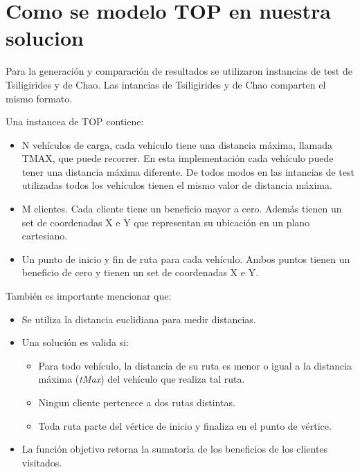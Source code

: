 \section{Como se modelo TOP en nuestra solucion}

Para la generación y comparación de resultados se utilizaron instancias de test de Tsiligirides y de Chao. Las intancias de Tsiligirides y de Chao comparten el mismo formato. 

\bigskip

\begin{minipage}{\textwidth}
Una instancea de TOP contiene:

\begin{itemize}
  \item N vehículos de carga, cada vehículo tiene una distancia máxima, llamada TMAX, que puede recorrer. En esta implementación cada vehículo puede tener una distancia máxima diferente. De todos modos en las intancias de test utilizadas todos los vehículos tienen el mismo valor de distancia máxima.
  \item M clientes. Cada cliente tiene un beneficio mayor a cero. Además tienen un set de coordenadas X e Y que representan su ubicación en un plano cartesiano.
  \item Un punto de inicio y fin de ruta para cada vehículo. Ambos puntos tienen un beneficio de cero y tienen un set de coordenadas X e Y.
\end{itemize}
\end{minipage}

\bigskip

\begin{minipage}{\textwidth}
También es importante mencionar que:

\begin{itemize}
	\item Se utiliza la distancia euclidiana para medir distancias.
	\item Una solución es valida si:
	\begin{itemize}
		\item Para todo vehículo, la distancia de su ruta es menor o igual a la distancia máxima (\textit{tMax}) del vehículo que realiza tal ruta.
		\item Ningun cliente pertenece a dos rutas distintas.
		\item Toda ruta parte del vértice de inicio y finaliza en el punto de vértice.
	\end{itemize}
	\item La función objetivo retorna la sumatoria de los beneficios de los clientes visitados.
\end{itemize}
\end{minipage}





























